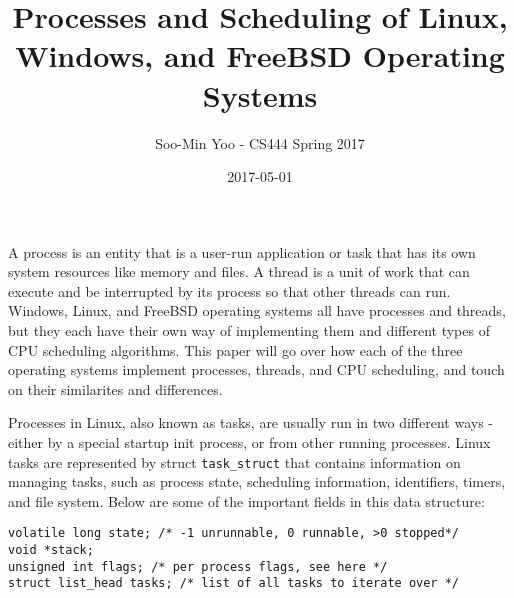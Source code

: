 \documentclass[10pt,draftclsnofoot,onecolumn,letterpaper]{IEEEtran}
\begin{document}
\title{Processes and Scheduling of Linux, Windows, and FreeBSD Operating Systems}
\author{Soo-Min Yoo - CS444 Spring 2017}
\date{2017-05-01}
\maketitle{}


A process is an entity that is a user-run application or task that has its own system resources like memory and files. A thread is a unit of work that can execute and be interrupted by its process so that other threads can run. Windows, Linux, and FreeBSD operating systems all have processes and threads, but they each have their own way of implementing them and different types of CPU scheduling algorithms. This paper will go over how each of the three operating systems implement processes, threads, and CPU scheduling, and touch on their similarites and differences.

Processes in Linux, also known as tasks, are usually run in two different ways - either by a special startup init process, or from other running processes. Linux tasks are represented by struct \verb!task_struct! that contains information on managing tasks, such as process state, scheduling information, identifiers, timers, and file system. Below are some of the important fields in this data structure\cite{1}:

\begin{verbatim}
volatile long state; /* -1 unrunnable, 0 runnable, >0 stopped*/
void *stack;
unsigned int flags; /* per process flags, see here */
struct list_head tasks; /* list of all tasks to iterate over */
\end{verbatim}
\end{document}
